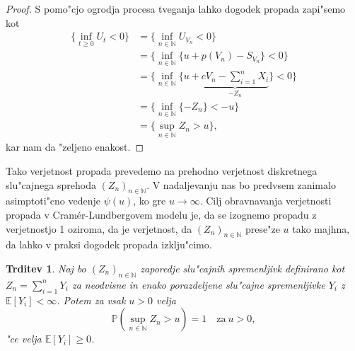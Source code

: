 \documentclass[12pt, a4paper, reqno]{amsart}
\theoremstyle{definition}
\theoremstyle{plain}
\newtheorem{trditev}[definicija]{Trditev}
\newcommand{\N}{\mathbb{N}}
\newcommand{\E}{\mathbb{E}}
\newcommand{\Prob}{\mathbb{P}}
\newcommand{\1}{\mathds{1}}
\begin{document}
        \begin{proof}

            S pomo"cjo ogrodja procesa tveganja lahko dogodek propada zapi"semo kot
            \begin{align*}
                \biggl\{\inf_{t\geq0}U_t<0\biggr\} &= \biggl\{\inf_{n\in\N}U_{V_n}<0\biggr\} \\
                              &= \biggl\{\inf_{n\in\N}\bigl\{u + p(V_n) - S_{V_n}\bigr\} < 0\biggr\} \\
                              &= \biggl\{\inf_{n\in\N}\biggl\{u + 
                              \underbrace{cV_n - \sum_{i=1}^nX_i}_{-Z_n}\biggr\} < 0\biggr\} \\
                              &= \biggl\{\inf_{n\in\N}\{-Z_n\} < -u\biggr\} \\
                              &= \biggl\{\sup_{n\in\N}Z_n > u\biggr\},
            \end{align*}
            kar nam da "zeljeno enakost.
        \end{proof}

        Tako verjetnost propada prevedemo na prehodno verjetnost diskretnega slu"cajnega 
        sprehoda $(Z_n)_{n\in\N}$. V nadaljevanju nas bo predvsem zanimalo asimptoti"cno 
        vedenje $\psi(u)$, ko gre $u\rightarrow\infty$. Cilj obravnavanja verjetnosti propada v 
        Cramér-Lundbergovem modelu je, da se izognemo 
        propadu z verjetnostjo 1 oziroma, da je verjetnost, da $(Z_n)_{n\in\N}$ prese"ze $u$
        tako majhna, da lahko v praksi dogodek propada izklju"cimo. 


        \begin{trditev}
            Naj bo $(Z_n)_{n\in\N}$ zaporedje slu"cajnih spremenljivk definirano kot 
            $Z_n = \sum_{i=1}^nY_i$ za neodvisne in enako porazdeljene slu"cajne spremenljivke 
            $Y_i$ z $\E\left[Y_i\right] < \infty$. Potem za vsak $u>0$ velja
            \begin{equation*}
                \Prob\left(\sup_{n\in\N}Z_n > u\right) = 1 \quad \text{za} \ u > 0,
            \end{equation*}
            "ce velja $\E\left[Y_i\right] \geq 0$.
            \label{trd:propadZVerjetnostjo1}
        \end{trditev}
\end{document}
